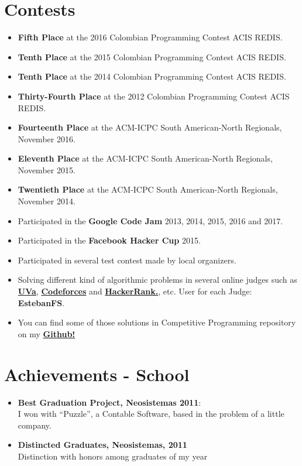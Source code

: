 \documentclass[a4paper,10pt]{article} %
\begin{document}
\section{Contests}
\begin{itemize}
 \item \textbf{Fifth Place} at the 2016 Colombian Programming Contest ACIS REDIS.
 \item \textbf{Tenth Place} at the 2015 Colombian Programming Contest ACIS REDIS.
 \item \textbf{Tenth Place} at the 2014 Colombian Programming Contest ACIS REDIS.
 \item \textbf{Thirty-Fourth Place} at the 2012 Colombian Programming Contest ACIS REDIS.
 \item \textbf{Fourteenth Place} at the ACM-ICPC South American-North Regionals, November 2016.
 \item \textbf{Eleventh Place} at the ACM-ICPC South American-North Regionals, November 2015.
 \item \textbf{Twentieth Place} at the ACM-ICPC South American-North Regionals, November 2014.
 \item Participated in the \textbf{Google Code Jam} 2013, 2014, 2015, 2016 and 2017.
 \item Participated in the \textbf{Facebook Hacker Cup} 2015.
 \item Participated in several test contest made by local organizers.
 \item Solving different kind of algorithmic problems in several online judges such as
\href{http://uhunt.felix-halim.net/id/152728}{\textbf{UVa}}, \href{http://codeforces.com/profile/EstebanFS}{\textbf{Codeforces}} and \href{https://www.hackerrank.com/EstebanFS}{\textbf{HackerRank.}}, etc.
User for each Judge: \textbf{EstebanFS}.
\item You can find some of those solutions in Competitive Programming repository on my \href{https://github.com/EstebanFS/Competitive-Programming}{\textbf{Github!}}
\end{itemize}


\section{Achievements - School}
\begin{itemize}
\item \textbf{Best Graduation Project, Neosistemas 2011}:\\
I won with ``Puzzle'', a Contable Software, based in the problem of a little company.
\item \textbf{Distincted Graduates, Neosistemas, 2011}\\
Distinction with honors among graduates of my year
\end{itemize}
\end{document}
